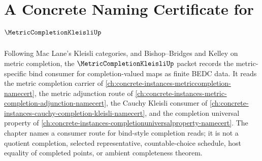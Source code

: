 \chapter{A Concrete Naming Certificate for $\MetricCompletionKleisliUp$}
\label{ch:concrete-instances-metric-completion-kleisli-namecert}

Following Mac Lane's Kleisli categories, and Bishop--Bridges and Kelley on metric completion, the $\MetricCompletionKleisliUp$ packet records the metric-specific bind consumer for completion-valued maps as finite BEDC data. It reads the metric completion carrier of \autoref{ch:concrete-instances-metriccompletion-namecert}, the metric adjunction route of \autoref{ch:concrete-instances-metric-completion-adjunction-namecert}, the Cauchy Kleisli consumer of \autoref{ch:concrete-instances-cauchy-completion-kleisli-namecert}, and the completion universal property of \autoref{ch:concrete-instances-completionuniversalproperty-namecert}. The chapter names a consumer route for bind-style completion reads; it is not a quotient completion, selected representative, countable-choice schedule, host equality of completed points, or ambient completeness theorem.

